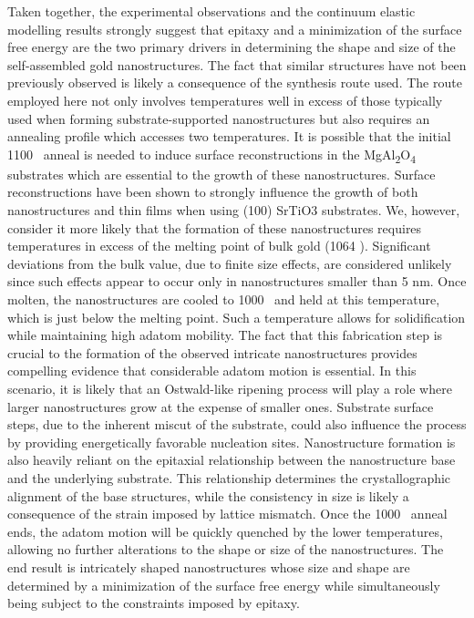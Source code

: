 Taken together, the experimental observations and the continuum elastic modelling results strongly suggest that epitaxy and a minimization of the surface free energy are the two primary drivers in determining the shape and size of the self-assembled gold nanostructures.
The fact that similar structures have not been previously observed is likely a consequence of the synthesis route used.
The route employed here not only involves temperatures well in excess of those typically used when forming substrate-supported nanostructures but also requires an annealing profile which accesses two temperatures.
It is possible that the initial 1100 \celsius~anneal is needed to induce surface reconstructions in the MgAl\textsubscript{2}O\textsubscript{4} substrates which are essential to the growth of these nanostructures.
Surface reconstructions have been shown to strongly influence the growth of both nanostructures\cite{RefWorks:24,RefWorks:16,RefWorks:104} and thin films\cite{Neretina2009a} when using (100) SrTiO3 substrates.
We, however, consider it more likely that the formation of these nanostructures requires temperatures in excess of the melting point of bulk gold (1064 \celsius).
Significant deviations from the bulk value, due to finite size effects, are considered unlikely since such effects appear to occur only in nanostructures smaller than 5 nm\cite{RefWorks:43}.
Once molten, the nanostructures are cooled to 1000 \celsius~and held at this temperature, which is just below the melting point.
Such a temperature allows for solidification while maintaining high adatom mobility.
The fact that this fabrication step is crucial to the formation of the observed intricate nanostructures provides compelling evidence that considerable adatom motion is essential.
In this scenario, it is likely that an Ostwald-like ripening process will play a role where larger nanostructures grow at the expense of smaller ones.
Substrate surface steps, due to the inherent miscut of the substrate\cite{RefWorks:69}, could also influence the process by providing energetically favorable nucleation sites.
Nanostructure formation is also heavily reliant on the epitaxial relationship between the nanostructure base and the underlying substrate.
This relationship determines the crystallographic alignment of the base structures, while the consistency in size is likely a consequence of the strain imposed by lattice mismatch.
Once the 1000 \celsius~anneal ends, the adatom motion will be quickly quenched by the lower temperatures, allowing no further alterations to the shape or size of the nanostructures.
The end result is intricately shaped nanostructures whose size and shape are determined by a minimization of the surface free energy while simultaneously being subject to the constraints imposed by epitaxy.
